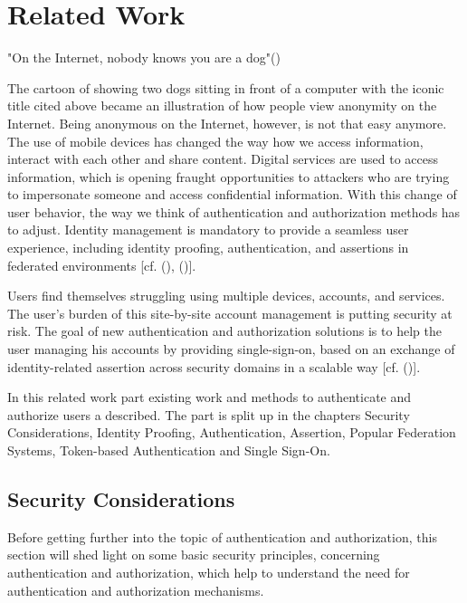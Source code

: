 \chapter{Related Work}\label{chap:authenticationandauthorization}

\chapterstart


"On the Internet, nobody knows you are a dog"(\cite{Steiner:Dog:1992})

The cartoon of \cite{Steiner:Dog:1992} showing two dogs sitting in front of a computer with the iconic title cited above became an illustration of how people view anonymity on the Internet. Being anonymous on the Internet, however, is not that easy anymore. The use of mobile devices has changed the way how we access information, interact with each other and share content. Digital services are used to access information, which is opening fraught opportunities to attackers who are trying to impersonate someone and access confidential information.  With this change of user behavior, the way we think of authentication and authorization methods has to adjust. Identity management is mandatory to provide a seamless user experience, including identity proofing, authentication, and assertions in federated environments [cf. (\cite{NIST:2017:DIG}), (\cite{Corre:2017:WHI})].


Users find themselves struggling using multiple devices, accounts, and services. The user's burden of this site-by-site account management is putting security at risk. The goal of new authentication and authorization solutions is to help the user managing his accounts by providing single-sign-on, based on an exchange of identity-related assertion across security domains in a scalable way [cf. (\cite{Corre:2017:WHI})].  

In this related work part existing work and methods to authenticate and authorize users a described. The part is split up in the chapters Security Considerations, Identity Proofing, Authentication, Assertion, Popular Federation Systems, Token-based Authentication and Single Sign-On.
  

\section{Security Considerations}
\label{securityConsiderations}

Before getting further into the topic of authentication and authorization, this section will shed light on some basic security principles, concerning authentication and authorization, which help to understand the need for authentication and authorization mechanisms. 

